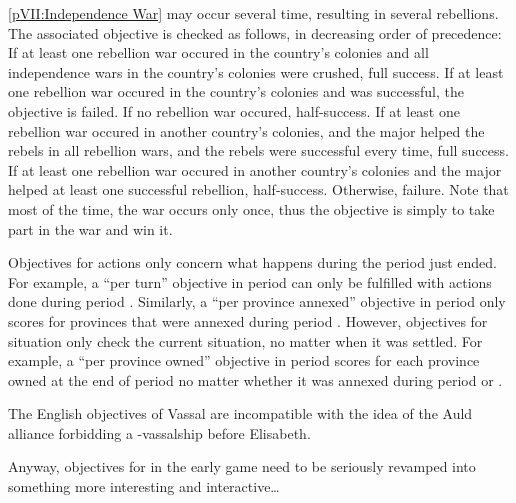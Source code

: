  \ref{pVII:Independence War} may occur
several time, resulting in several rebellions. The associated objective
is checked as follows, in decreasing order of precedence:
\bparag If at least one rebellion war occured in the country's colonies
and all independence wars in the country's colonies were crushed, full
success.
\bparag If at least one rebellion war occured in the country's colonies
and was successful, the objective is failed.
\bparag If no rebellion war occured, half-success.
\bparag If at least one rebellion war occured in another country's
colonies, and the major helped the rebels in all rebellion wars, and the
rebels were successful every time, full success.
\bparag If at least one rebellion war occured in another country's
colonies and the major helped at least one successful rebellion,
half-success.
\bparag Otherwise, failure.
\bparag Note that most of the time, the war occurs only once, thus the
objective is simply to take part in the war and win it.


\aparag[Duration.] Objectives for actions only concern what happens
during the period just ended.
\bparag For example, a ``per turn'' objective in period  can
only be fulfilled with actions done during period
.
\bparag Similarly, a ``per province annexed'' objective in period
 only scores \VPs for provinces that were annexed during
period .
\bparag However, objectives for situation only check the current
situation, no matter when it was settled.
\bparag For example, a ``per province owned'' objective in period
 scores for each province owned at the end of period
 no matter whether it was annexed during period  or
.

\begin{todo}
  The English objectives of \paysEcosse Vassal are incompatible with the
  idea of the Auld alliance forbidding a \ANG-\paysEcosse vassalship
  before Elisabeth.

  Anyway, objectives for \ANG in the early game need to be seriously
  revamped into something more interesting and interactive\ldots
\end{todo}



